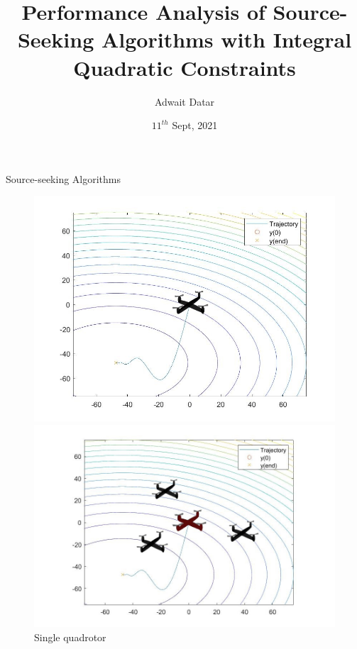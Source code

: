 \documentclass{beamer}
\title[Performance Analysis of Source-Seeking Algorithms with Integral Quadratic Constraints]{Performance Analysis of Source-Seeking Algorithms with Integral Quadratic Constraints}
\author{Adwait Datar}
\institute{PhD Workshop, 2021\\Technical University of Hamburg}
\date{$11^{th}$ Sept, 2021}
\begin{document}
\begin{frame}	
  \titlepage
\end{frame}

\begin{frame}{Source-seeking Algorithms}
	\begin{figure}[!htb]
		\centering
		\begin{minipage}{.5\textwidth}
			\centering
			\includegraphics[width=0.9\linewidth,height=0.45\textheight]{figures/single_quad_field.jpg}
			\caption{Single quadrotor}
			\label{fig:single_quad}
		\end{minipage}%
		\begin{minipage}{0.5\textwidth}
			\centering
			\includegraphics[width=\linewidth,height=0.45\textheight]{figures/multiple_quad_field.jpg}

\end{minipage}
\end{figure}
\end{frame}
\end{document}

